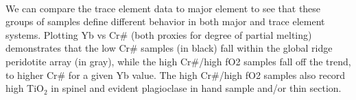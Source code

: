 \documentclass[11pt]{article}
\begin{document}
    \begin{center}
    \end{center}
    { \hspace*{\fill} \\}
    
    We can compare the trace element data to major element to see that these
groups of samples define different behavior in both major and trace
element systems. Plotting Yb vs Cr\# (both proxies for degree of partial
melting) demonstrates that the low Cr\# samples (in black) fall within
the global ridge peridotite array (in gray), while the high Cr\#/high
fO2 samples fall off the trend, to higher Cr\# for a given Yb value. The
high Cr\#/high fO2 samples also record high TiO\(_2\) in spinel and
evident plagioclase in hand sample and/or thin section.
\end{document}
